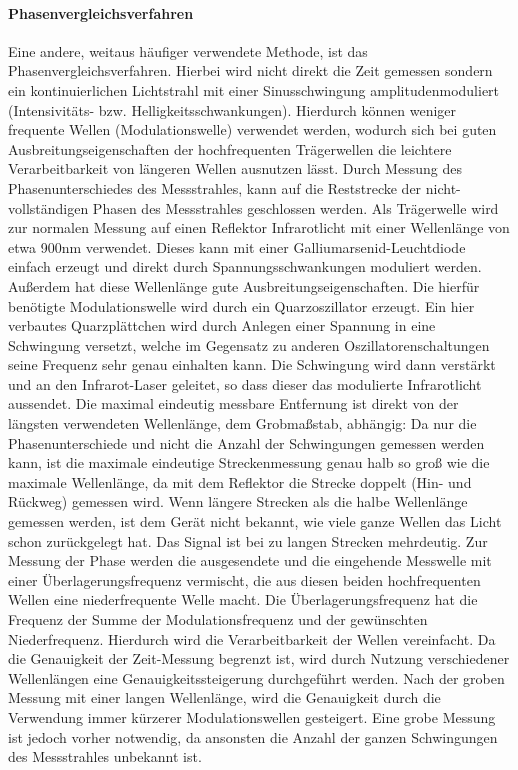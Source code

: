 \documentclass[a4paper,12pt,bibliography=totoc, listof=totoc,titlepage,pointlessnumbers]{scrreprt}
\begin{document}
\paragraph{Phasenvergleichsverfahren}
Eine andere, weitaus häufiger verwendete Methode, ist das Phasenvergleichsverfahren. Hierbei wird nicht direkt die Zeit gemessen sondern ein kontinuierlichen Lichtstrahl mit einer Sinusschwingung amplitudenmoduliert (Intensivitäts- bzw. Helligkeitsschwankungen). Hierdurch können weniger frequente Wellen (Modulationswelle) verwendet werden, wodurch sich bei guten Ausbreitungseigenschaften der hochfrequenten Trägerwellen die leichtere Verarbeitbarkeit von längeren Wellen ausnutzen lässt. Durch Messung des Phasenunterschiedes des Messstrahles, kann auf die Reststrecke der nicht-vollständigen Phasen des Messstrahles geschlossen werden. Als Trägerwelle wird zur normalen Messung auf einen Reflektor Infrarotlicht mit einer Wellenlänge von etwa 900nm verwendet. Dieses kann mit einer Galliumarsenid-Leuchtdiode einfach erzeugt und direkt durch Spannungsschwankungen moduliert werden. Außerdem hat diese Wellenlänge gute Ausbreitungseigenschaften. Die hierfür benötigte Modulationswelle wird durch ein Quarzoszillator erzeugt. Ein hier verbautes Quarzplättchen wird durch Anlegen einer Spannung in eine Schwingung versetzt, welche im Gegensatz zu anderen Oszillatorenschaltungen seine Frequenz sehr genau einhalten kann. Die Schwingung wird dann verstärkt und an den Infrarot-Laser geleitet, so dass dieser das modulierte Infrarotlicht aussendet. Die maximal eindeutig messbare Entfernung ist direkt von der längsten verwendeten Wellenlänge, dem Grobmaßstab, abhängig: Da nur die Phasenunterschiede und nicht die Anzahl der Schwingungen gemessen werden kann, ist die maximale eindeutige  Streckenmessung genau halb so groß wie die maximale Wellenlänge, da mit dem Reflektor die Strecke doppelt (Hin- und Rückweg) gemessen wird. Wenn längere Strecken als die halbe Wellenlänge gemessen werden, ist dem Gerät nicht bekannt, wie viele ganze Wellen das Licht schon zurückgelegt hat. Das Signal ist bei zu langen Strecken mehrdeutig. Zur Messung der Phase werden die ausgesendete und die eingehende Messwelle mit einer Überlagerungsfrequenz vermischt, die aus diesen beiden hochfrequenten Wellen eine niederfrequente Welle macht. Die Überlagerungsfrequenz hat die Frequenz der Summe der Modulationsfrequenz und der gewünschten Niederfrequenz. Hierdurch wird die Verarbeitbarkeit der Wellen vereinfacht. Da die Genauigkeit der Zeit-Messung begrenzt ist, wird durch Nutzung verschiedener Wellenlängen eine Genauigkeitssteigerung durchgeführt werden. Nach der groben Messung mit einer langen Wellenlänge, wird die Genauigkeit durch die Verwendung immer kürzerer Modulationswellen gesteigert. Eine grobe Messung ist jedoch vorher notwendig, da ansonsten die Anzahl der ganzen Schwingungen des Messstrahles unbekannt ist. \citep[S. 311ff]{Witte2006}
\end{document}
